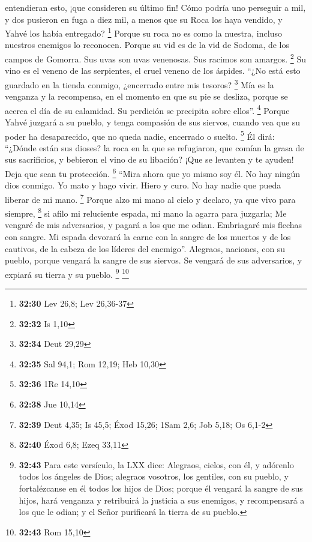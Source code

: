 entendieran esto, ¡que consideren su último fin!  Cómo
podría uno perseguir a mil, y dos pusieron en fuga a diez mil, a menos
que su Roca los haya vendido, y Yahvé los había entregado? \footnote{\textbf{32:30}
  Lev 26,8; Lev 26,36-37}  Porque su roca no es como la
nuestra, incluso nuestros enemigos lo reconocen.  Porque
su vid es de la vid de Sodoma, de los campos de Gomorra. Sus uvas son
uvas venenosas. Sus racimos son amargos. \footnote{\textbf{32:32} Is
  1,10}  Su vino es el veneno de las serpientes, el cruel
veneno de los áspides.  ``¿No está esto guardado en la
tienda conmigo, ¿encerrado entre mis tesoros? \footnote{\textbf{32:34}
  Deut 29,29}  Mía es la venganza y la recompensa, en el
momento en que su pie se desliza, porque se acerca el día de su
calamidad. Su perdición se precipita sobre ellos''. \footnote{\textbf{32:35}
  Sal 94,1; Rom 12,19; Heb 10,30}  Porque Yahvé juzgará a
su pueblo, y tenga compasión de sus siervos, cuando vea que su poder ha
desaparecido, que no queda nadie, encerrado o suelto. \footnote{\textbf{32:36}
  1Re 14,10}  Él dirá: ``¿Dónde están sus dioses? la roca
en la que se refugiaron,  que comían la grasa de sus
sacrificios, y bebieron el vino de su libación? ¡Que se levanten y te
ayuden! Deja que sean tu protección. \footnote{\textbf{32:38} Jue 10,14}
 ``Mira ahora que yo mismo soy él. No hay ningún dios
conmigo. Yo mato y hago vivir. Hiero y curo. No hay nadie que pueda
liberar de mi mano. \footnote{\textbf{32:39} Deut 4,35; Is 45,5; Éxod
  15,26; 1Sam 2,6; Job 5,18; Os 6,1-2}  Porque alzo mi
mano al cielo y declaro, ya que vivo para siempre, \footnote{\textbf{32:40}
  Éxod 6,8; Ezeq 33,11}  si afilo mi reluciente espada,
mi mano la agarra para juzgarla; Me vengaré de mis adversarios, y pagará
a los que me odian.  Embriagaré mis flechas con sangre.
Mi espada devorará la carne con la sangre de los muertos y de los
cautivos, de la cabeza de los líderes del enemigo''. 
Alegraos, naciones, con su pueblo, porque vengará la sangre de sus
siervos. Se vengará de sus adversarios, y expiará su tierra y su pueblo.
\footnote{\textbf{32:43} Para este versículo, la LXX dice: Alegraos,
  cielos, con él, y adórenlo todos los ángeles de Dios; alegraos
  vosotros, los gentiles, con su pueblo, y fortalézcanse en él todos los
  hijos de Dios; porque él vengará la sangre de sus hijos, hará venganza
  y retribuirá la justicia a sus enemigos, y recompensará a los que le
  odian; y el Señor purificará la tierra de su pueblo.} \footnote{\textbf{32:43}
  Rom 15,10}

